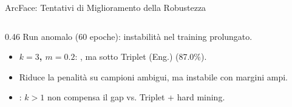 \documentclass[aspectratio=169, 10pt]{beamer}
\begin{document}
\begin{frame}{ArcFace: Tentativi di Miglioramento della Robustezza}
\begin{columns}[T, onlytextwidth]
\begin{column}{0.46\textwidth}
    \smallskip
    {\tiny\color{colText!65!white}
    \bad{*} Run anomalo (60 epoche): instabilità nel training prolungato.}

    \smallskip
    {\tiny
    \begin{itemize}
        \setlength{\itemsep}{1pt}
        \setlength{\parskip}{0pt}
        \item \textbf{$k=3$, $m=0.2$}: , ma sotto Triplet (Eng.) (87.0\%).
        \item Riduce la penalità su campioni ambigui, ma instabile con margini ampi.
        \item {}: $k>1$ non compensa il gap vs. Triplet + hard mining.
    \end{itemize}
    }
\end{column}

\end{columns}
\end{frame}

\end{document}
